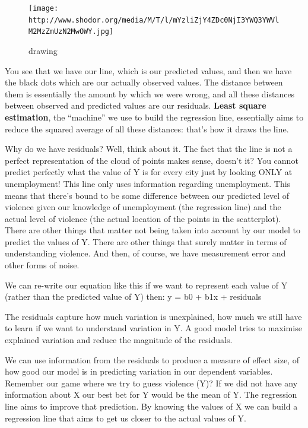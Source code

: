 \documentclass[
]{book}
\begin{document}
\begin{figure}
\centering
\texttt{[image: http://www.shodor.org/media/M/T/l/mYzliZjY4ZDc0NjI3YWQ3YWVlM2MzZmUzN2MwOWY.jpg]}
\caption{drawing}
\end{figure}

You see that we have our line, which is our predicted values, and then we have the black dots which are our actually observed values. The distance between them is essentially the amount by which we were wrong, and all these distances between observed and predicted values are our residuals. \textbf{Least square estimation}, the ``machine'' we use to build the regression line, essentially aims to reduce the squared average of all these distances: that's how it draws the line.

Why do we have residuals? Well, think about it. The fact that the line is not a perfect representation of the cloud of points makes sense, doesn't it? You cannot predict perfectly what the value of Y is for every city just by looking ONLY at unemployment! This line only uses information regarding unemployment. This means that there's bound to be some difference between our predicted level of violence given our knowledge of unemployment (the regression line) and the actual level of violence (the actual location of the points in the scatterplot). There are other things that matter not being taken into account by our model to predict the values of Y. There are other things that surely matter in terms of understanding violence. And then, of course, we have measurement error and other forms of noise.

We can re-write our equation like this if we want to represent each value of Y (rather than the predicted value of Y) then:
y = b0 + b1x + residuals

The residuals capture how much variation is unexplained, how much we still have to learn if we want to understand variation in Y. A good model tries to maximise explained variation and reduce the magnitude of the residuals.

We can use information from the residuals to produce a measure of effect size, of how good our model is in predicting variation in our dependent variables. Remember our game where we try to guess violence (Y)? If we did not have any information about X our best bet for Y would be the mean of Y. The regression line aims to improve that prediction. By knowing the values of X we can build a regression line that aims to get us closer to the actual values of Y.
\end{document}
